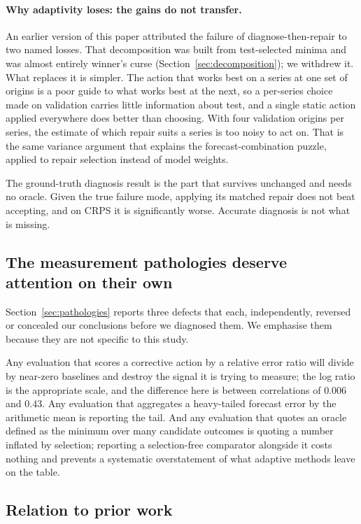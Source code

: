 \paragraph{Why adaptivity loses: the gains do not transfer.}
An earlier version of this paper attributed the failure of diagnose-then-repair to two
named losses. That decomposition was built from test-selected minima and was almost
entirely winner's curse (Section~\ref{sec:decomposition}); we withdrew it. What
replaces it is simpler. The action that works best on a series at one set of origins
is a poor guide to what works best at the next, so a per-series choice made on
validation carries little information about test, and a single static action applied
everywhere does better than choosing. With four validation origins per series, the
estimate of which repair suits a series is too noisy to act on. That is the same
variance argument that explains the forecast-combination puzzle, applied to repair
selection instead of model weights.

The ground-truth diagnosis result is the part that survives unchanged and needs no
oracle. Given the true failure mode, applying its matched repair does not beat
accepting, and on CRPS it is significantly worse. Accurate diagnosis is not what is
missing.

\subsection{The measurement pathologies deserve attention on their own}

Section~\ref{sec:pathologies} reports three defects that each, independently, reversed or
concealed our conclusions before we diagnosed them. We emphasise them because they are
not specific to this study.

Any evaluation that scores a corrective action by a relative error ratio will divide by
near-zero baselines and destroy the signal it is trying to measure; the log ratio is the
appropriate scale, and the difference here is between correlations of $0.006$ and $0.43$.
Any evaluation that aggregates a heavy-tailed forecast error by the arithmetic mean is
reporting the tail. And any evaluation that quotes an oracle defined as the minimum over
many candidate outcomes is quoting a number inflated by selection; reporting a
selection-free comparator alongside it costs nothing and prevents a systematic
overstatement of what adaptive methods leave on the table.

\subsection{Relation to prior work}


